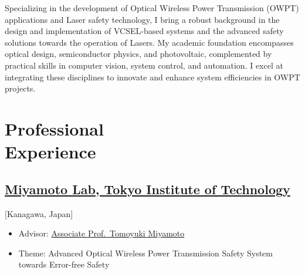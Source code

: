 \documentclass{mycv}
\begin{document}
\maketitle%

\begin{summary}
Specializing in the development of Optical Wireless Power Transmission (OWPT) applications and Laser safety technology, I bring a robust background in the design and implementation of VCSEL-based systems and the advanced safety solutions towards the operation of Lasers. My academic foundation encompasses optical design, semiconductor physics, and photovoltaic, complemented by practical skills in computer vision, system control, and automation. I excel at integrating these disciplines to innovate and enhance system efficiencies in OWPT projects.
\end{summary}

\section{Professional \\ Experience}

\subsection{\href{http://vcsel-www.pi.titech.ac.jp/index-j.html}{Miyamoto Lab, Tokyo Institute of Technology}}[Kanagawa, Japan]
\begin{positions}
\end{positions}
\begin{itemize}
	\item Advisor: \href{https://www.first.iir.titech.ac.jp/member/core3.html#miyamoto}{Associate Prof.~Tomoyuki Miyamoto}
	\item Theme: Advanced Optical Wireless Power Transmission Safety System towards Error-free Safety
\end{itemize}

\end{document}
